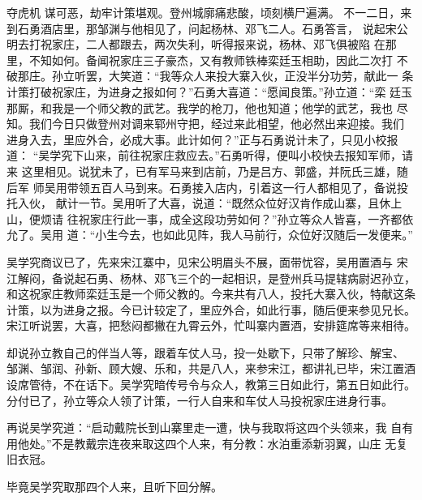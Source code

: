 夺虎机
谋可恶，劫牢计策堪观。登州城廓痛悲酸，顷刻横尸遍满。
不一二日，来到石勇酒店里，那邹渊与他相见了，问起杨林、邓飞二人。石勇答言，
说起宋公明去打祝家庄，二人都跟去，两次失利，听得报来说，杨林、邓飞俱被陷
在那里，不知如何。备闻祝家庄三子豪杰，又有教师铁棒栾廷玉相助，因此二次打
不破那庄。孙立听罢，大笑道：“我等众人来投大寨入伙，正没半分功劳，献此一
条计策打破祝家庄，为进身之报如何？”石勇大喜道：“愿闻良策。”孙立道：“栾
廷玉那厮，和我是一个师父教的武艺。我学的枪刀，他也知道；他学的武艺，我也
尽知。我们今日只做登州对调来郓州守把，经过来此相望，他必然出来迎接。我们
进身入去，里应外合，必成大事。此计如何？”正与石勇说计未了，只见小校报道：
“吴学究下山来，前往祝家庄救应去。”石勇听得，便叫小校快去报知军师，请来
这里相见。说犹未了，已有军马来到店前，乃是吕方、郭盛，并阮氏三雄，随后军
师吴用带领五百人马到来。石勇接入店内，引着这一行人都相见了，备说投托入伙，
献计一节。吴用听了大喜，说道：“既然众位好汉肯作成山寨，且休上山，便烦请
往祝家庄行此一事，成全这段功劳如何？”孙立等众人皆喜，一齐都依允了。吴用
道：“小生今去，也如此见阵，我人马前行，众位好汉随后一发便来。”

吴学究商议已了，先来宋江寨中，见宋公明眉头不展，面带忧容，吴用置酒与
宋江解闷，备说起石勇、杨林、邓飞三个的一起相识，是登州兵马提辖病尉迟孙立，
和这祝家庄教师栾廷玉是一个师父教的。今来共有八人，投托大寨入伙，特献这条
计策，以为进身之报。今已计较定了，里应外合，如此行事，随后便来参见兄长。
宋江听说罢，大喜，把愁闷都撇在九霄云外，忙叫寨内置酒，安排筵席等来相待。

却说孙立教自己的伴当人等，跟着车仗人马，投一处歇下，只带了解珍、解宝、
邹渊、邹润、孙新、顾大嫂、乐和，共是八人，来参宋江，都讲礼已毕，宋江置酒
设席管待，不在话下。吴学究暗传号令与众人，教第三日如此行，第五日如此行。
分付已了，孙立等众人领了计策，一行人自来和车仗人马投祝家庄进身行事。

再说吴学究道：“启动戴院长到山寨里走一遭，快与我取将这四个头领来，我
自有用他处。”不是教戴宗连夜来取这四个人来，有分教：水泊重添新羽翼，山庄
无复旧衣冠。

毕竟吴学究取那四个人来，且听下回分解。